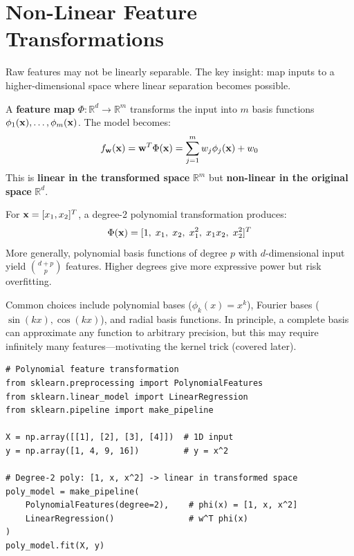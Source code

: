 \section*{Non-Linear Feature Transformations}

Raw features may not be linearly separable. The key insight: map inputs to a higher-dimensional space where linear separation becomes possible.

\begin{definition}
A \textbf{feature map} $\Phi: \mathbb{R}^d \to \mathbb{R}^m$ transforms the input into $m$ basis functions $\phi_1(\mathbf{x}), \dots, \phi_m(\mathbf{x})$. The model becomes:
$$f_{\mathbf{w}}(\mathbf{x}) = \mathbf{w}^T \Phi(\mathbf{x}) = \sum_{j=1}^{m} w_j \phi_j(\mathbf{x}) + w_0$$
This is \textbf{linear in the transformed space} $\mathbb{R}^m$ but \textbf{non-linear in the original space} $\mathbb{R}^d$.
\end{definition}

\begin{remark}
For $\mathbf{x} = [x_1, x_2]^T$, a degree-2 polynomial transformation produces:
$$\Phi(\mathbf{x}) = [1,\; x_1,\; x_2,\; x_1^2,\; x_1 x_2,\; x_2^2]^T$$
More generally, polynomial basis functions of degree $p$ with $d$-dimensional input yield $\binom{d+p}{p}$ features. Higher degrees give more expressive power but risk overfitting.
\end{remark}

\begin{remark}
Common choices include polynomial bases ($\phi_k(x) = x^k$), Fourier bases ($\sin(kx), \cos(kx)$), and radial basis functions. In principle, a complete basis can approximate any function to arbitrary precision, but this may require infinitely many features---motivating the kernel trick (covered later).
\end{remark}

\begin{lstlisting}[style=pythonstyle]
# Polynomial feature transformation
from sklearn.preprocessing import PolynomialFeatures
from sklearn.linear_model import LinearRegression
from sklearn.pipeline import make_pipeline

X = np.array([[1], [2], [3], [4]])  # 1D input
y = np.array([1, 4, 9, 16])         # y = x^2

# Degree-2 poly: [1, x, x^2] -> linear in transformed space
poly_model = make_pipeline(
    PolynomialFeatures(degree=2),    # phi(x) = [1, x, x^2]
    LinearRegression()               # w^T phi(x)
)
poly_model.fit(X, y)
\end{lstlisting}

